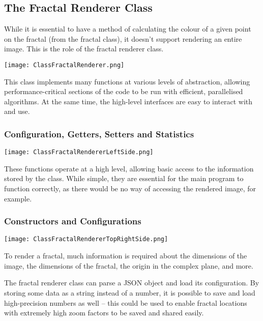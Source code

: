 \subsection{The Fractal Renderer Class}

While it is essential to have a method of calculating the colour of a given point on the fractal (from the fractal class), it doesn't support rendering an entire image. This is the role of the fractal renderer class.

\FloatBarrier
\begin{figure*}[htp]
	\centering
	\texttt{[image: ClassFractalRenderer.png]}
\end{figure*}
\FloatBarrier

This class implements many functions at various levels of abstraction, allowing performance-critical sections of the code to be run with efficient, parallelised algorithms. At the same time, the high-level interfaces are easy to interact with and use.

\subsubsection{Configuration, Getters, Setters and Statistics}

\FloatBarrier
\begin{figure*}[htp]
	\centering
	\texttt{[image: ClassFractalRendererLeftSide.png]}
\end{figure*}
\FloatBarrier

These functions operate at a high level, allowing basic access to the information stored by the class. While simple, they are essential for the main program to function correctly, as there would be no way of accessing the rendered image, for example.

\subsubsection{Constructors and Configurations}

\FloatBarrier
\begin{figure*}[htp]
	\centering
	\texttt{[image: ClassFractalRendererTopRightSide.png]}
\end{figure*}
\FloatBarrier

To render a fractal, much information is required about the dimensions of the image, the dimensions of the fractal, the origin in the complex plane, and more.

The fractal renderer class can parse a JSON object and load its configuration. By storing some data as a string instead of a number, it is possible to save and load high-precision numbers as well -- this could be used to enable fractal locations with extremely high zoom factors to be saved and shared easily.

